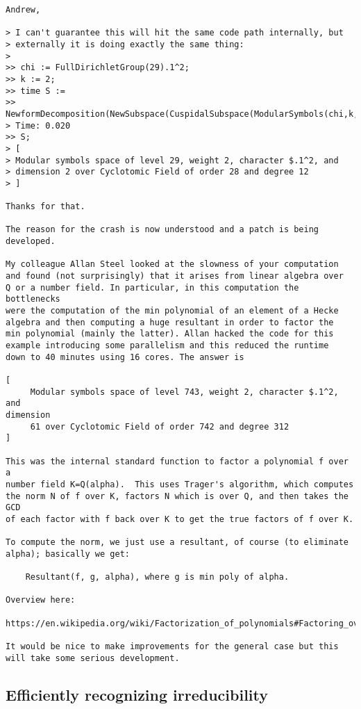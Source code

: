 \documentclass[11pt]{amsart}
\numberwithin{equation}{subsection}
\theoremstyle{plain}
\theoremstyle{definition}
\begin{document}
\begin{verbatim}
Andrew,

> I can't guarantee this will hit the same code path internally, but
> externally it is doing exactly the same thing:
> 
>> chi := FullDirichletGroup(29).1^2;
>> k := 2;
>> time S :=
>> NewformDecomposition(NewSubspace(CuspidalSubspace(ModularSymbols(chi,k,-1))));
> Time: 0.020
>> S;
> [
> Modular symbols space of level 29, weight 2, character $.1^2, and
> dimension 2 over Cyclotomic Field of order 28 and degree 12
> ]

Thanks for that.

The reason for the crash is now understood and a patch is being
developed.

My colleague Allan Steel looked at the slowness of your computation
and found (not surprisingly) that it arises from linear algebra over
Q or a number field. In particular, in this computation the bottlenecks
were the computation of the min polynomial of an element of a Hecke
algebra and then computing a huge resultant in order to factor the
min polynomial (mainly the latter). Allan hacked the code for this
example introducing some parallelism and this reduced the runtime
down to 40 minutes using 16 cores. The answer is

[
     Modular symbols space of level 743, weight 2, character $.1^2, and 
dimension
     61 over Cyclotomic Field of order 742 and degree 312
]

This was the internal standard function to factor a polynomial f over a
number field K=Q(alpha).  This uses Trager's algorithm, which computes
the norm N of f over K, factors N which is over Q, and then takes the GCD
of each factor with f back over K to get the true factors of f over K.

To compute the norm, we just use a resultant, of course (to eliminate
alpha); basically we get:

    Resultant(f, g, alpha), where g is min poly of alpha.

Overview here:

https://en.wikipedia.org/wiki/Factorization_of_polynomials#Factoring_over_algebraic_extensions_(Trager's_method)

It would be nice to make improvements for the general case but this
will take some serious development.
\end{verbatim}

\subsection{Efficiently recognizing irreducibility}
\end{document}
